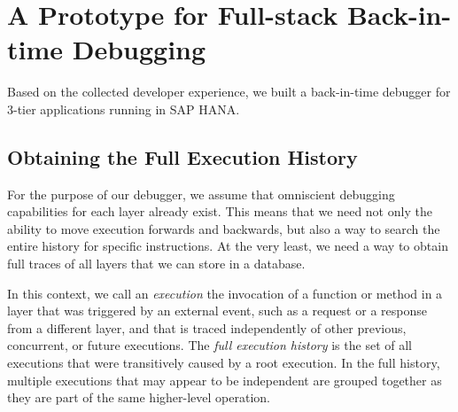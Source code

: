 %

\section{A Prototype for Full-stack Back-in-time Debugging}
\label{sec:debugger}

Based on the collected developer experience, we built a back-in-time debugger for 3-tier applications running in SAP HANA.

\subsection{Obtaining the Full Execution History}

For the purpose of our debugger, we assume that omniscient debugging capabilities for each layer already exist.
This means that we need not only the ability to move execution forwards and backwards, but also a way to search the entire history for specific instructions.
At the very least, we need a way to obtain full traces of all layers that we can store in a database.

In this context, we call an \emph{execution} the invocation of a function or method in a layer that was triggered by an external event, such as a request or a response from a different layer, and that is traced independently of other previous, concurrent, or future executions.
The \emph{full execution history} is the set of all executions that were transitively caused by a root execution.
In the full history, multiple executions that may appear to be independent are grouped together as they are part of the same higher-level operation.

